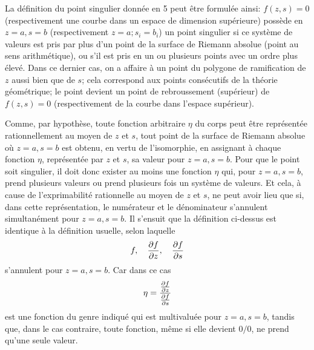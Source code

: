 La définition du point singulier donnée en 5 peut être formulée ainsi: \(f(z,s)=0\) (respectivement une courbe dans un espace de dimension supérieure) possède en \(z=a,s=b\) (respectivement \(z=a; s_i=b_i\)) un point singulier si ce système de valeurs est pris par plus d'un point de la surface de Riemann absolue (point au sens arithmétique), ou s'il est pris en un ou plusieurs points avec un ordre plus élevé. Dans ce dernier cas, on a affaire à un point du polygone de ramification de \(z\) aussi bien que de \(s\); cela correspond aux \og{}points consécutifs\fg{} de la théorie géométrique; le point devient un point de rebroussement (supérieur) de \(f(z,s)=0\) (respectivement de la courbe dans l'espace supérieur).

Comme, par hypothèse, toute fonction arbitraire \(\eta\) du corps peut être représentée rationnellement au moyen de \(z\) et \(s\), tout point de la surface de Riemann absolue où \(z=a,s=b\) est obtenu, en vertu de l'isomorphie, en assignant à chaque fonction \(\eta\), représentée par \(z\) et \(s\), sa valeur pour \(z=a,s=b\). Pour que le point soit singulier, il doit donc exister au moins une fonction \(\eta\) qui, pour \(z=a,s=b\), prend plusieurs valeurs ou prend plusieurs fois un système de valeurs. Et cela, à cause de l'exprimabilité rationnelle au moyen de \(z\) et \(s\), ne peut avoir lieu que si, dans cette représentation, le numérateur et le dénominateur s'annulent simultanément pour \(z=a,s=b\). Il s'ensuit que la définition ci-dessus est identique à la définition usuelle, selon laquelle
\[
f,\quad \frac{\partial f}{\partial z},\quad \frac{\partial f}{\partial s}
\]
s'annulent pour \(z=a,s=b\). Car dans ce cas
\[
\eta=\frac{\frac{\partial f}{\partial z}}{\frac{\partial f}{\partial s}}
\]
est une fonction du genre indiqué qui est multivaluée pour \(z=a,s=b\), tandis que, dans le cas contraire, toute fonction, même si elle devient \(0/0\), ne prend qu'une seule valeur.

